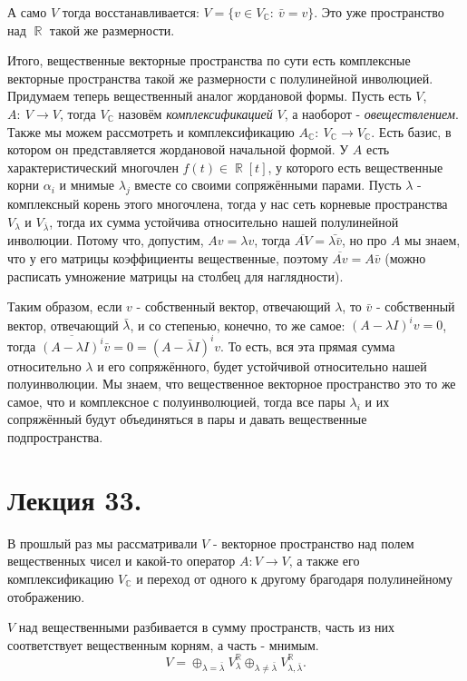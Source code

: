 \documentclass[a4paper,100pt]{article}
\theoremstyle{indented}
\theoremstyle{definition}
\theoremstyle{remark}
\DeclareMathOperator{\CC}{\mathbb{C}}
\DeclareMathOperator{\RR}{\mathbb{R}}
\begin{document}
А само $V$ тогда восстанавливается: $V=\{v\in V_{\CC}: \: \bar{v}=v\}$. Это уже пространство над $\RR$ такой же размерности. \ 

Итого, вещественные векторные пространства по сути есть комплексные векторные пространства такой же размерности с полулинейной инволюцией. Придумаем теперь вещественный аналог жордановой формы. Пусть есть $V$, $A: \: V\rightarrow V$, тогда $V_{\CC}$ назовём \textit{комплексификацией} $V$, а наоборот - \textit{овеществлением}. Также мы можем рассмотреть и комплексификацию $A_{\CC}: \: V_{\CC}\rightarrow V_{\CC}$. Есть базис, в котором он представляется жордановой начальной формой. У $A$ есть характеристический многочлен $f(t)\in \RR[t]$, у которого есть вещественные корни $\alpha_i$ и мнимые $\lambda_j$ вместе со своими сопряжёнными парами. Пусть $\lambda$ - комплексный корень этого многочлена, тогда у нас сеть корневые пространства $V_{\lambda}$ и $V_{\bar{\lambda}}$, тогда их сумма устойчива относительно нашей полулинейной инволюции. Потому что, допустим, $Av=\lambda v$, тогда $\overline{AV}=\bar{\lambda\bar{v}}$, но про $A$ мы знаем, что у его матрицы коэффициенты вещественные, поэтому $\overline{Av}=A\bar{v}$ (можно расписать умножение матрицы на столбец для наглядности). \ 

Таким образом, если $v$ - собственный вектор, отвечающий $\lambda$, то $\bar{v}$ - собственный вектор, отвечающий $\bar{\lambda}$, и со степенью, конечно, то же самое: $(A-\lambda I)^iv=0$, тогда $\overline{(A-\lambda I)^i}\bar{v}=0=(A-\bar{\lambda} I)^iv$. То есть, вся эта прямая сумма относительно $\lambda$ и его сопряжённого, будет устойчивой относительно нашей полуинволюции. Мы знаем, что вещественное векторное пространство это то же самое, что и комплексное с полуинволюцией, тогда все пары $\lambda_i$ и их сопряжённый будут объединяться в пары и давать вещественные подпространства. 

\section{Лекция 33.}

В прошлый раз мы рассматривали $V$ - векторное пространство над полем вещественных чисел и какой-то оператор $A: V\rightarrow V$, а также его комплексификацию $V_{\CC}$ и переход от одного к другому брагодаря полулинейному отображению. \ 

$V$ над вещественными разбивается в сумму пространств, часть из них соответствует вещественным корням, а часть - мнимым. 
\[
    V=\oplus_{\lambda=\bar{\lambda}}V_\lambda^{\RR}\oplus_{\lambda\neq\bar{\lambda}}V_{{\lambda, \bar{\lambda}}}^{\RR}.
\]
\end{document}
